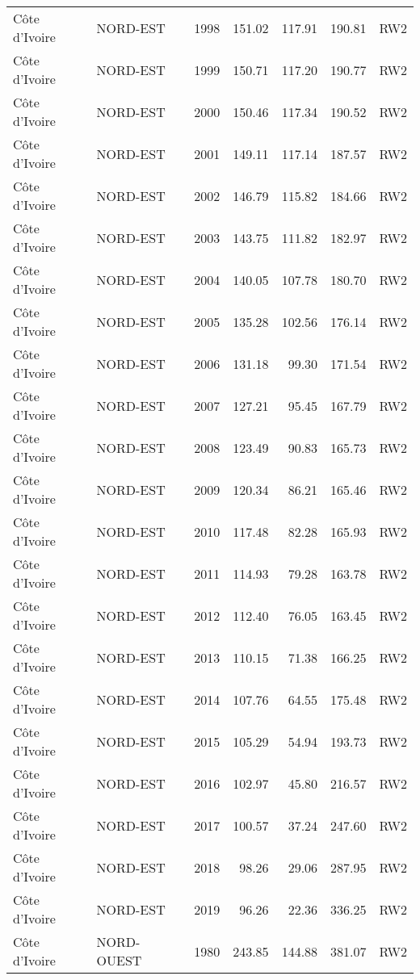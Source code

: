 \begin{longtable}{lllrrrl}
  C\^{o}te d'Ivoire & NORD-EST & 1998 & 151.02 & 117.91 & 190.81 & RW2 \\ 
  C\^{o}te d'Ivoire & NORD-EST & 1999 & 150.71 & 117.20 & 190.77 & RW2 \\ 
  C\^{o}te d'Ivoire & NORD-EST & 2000 & 150.46 & 117.34 & 190.52 & RW2 \\ 
  C\^{o}te d'Ivoire & NORD-EST & 2001 & 149.11 & 117.14 & 187.57 & RW2 \\ 
  C\^{o}te d'Ivoire & NORD-EST & 2002 & 146.79 & 115.82 & 184.66 & RW2 \\ 
  C\^{o}te d'Ivoire & NORD-EST & 2003 & 143.75 & 111.82 & 182.97 & RW2 \\ 
  C\^{o}te d'Ivoire & NORD-EST & 2004 & 140.05 & 107.78 & 180.70 & RW2 \\ 
  C\^{o}te d'Ivoire & NORD-EST & 2005 & 135.28 & 102.56 & 176.14 & RW2 \\ 
  C\^{o}te d'Ivoire & NORD-EST & 2006 & 131.18 & 99.30 & 171.54 & RW2 \\ 
  C\^{o}te d'Ivoire & NORD-EST & 2007 & 127.21 & 95.45 & 167.79 & RW2 \\ 
  C\^{o}te d'Ivoire & NORD-EST & 2008 & 123.49 & 90.83 & 165.73 & RW2 \\ 
  C\^{o}te d'Ivoire & NORD-EST & 2009 & 120.34 & 86.21 & 165.46 & RW2 \\ 
  C\^{o}te d'Ivoire & NORD-EST & 2010 & 117.48 & 82.28 & 165.93 & RW2 \\ 
  C\^{o}te d'Ivoire & NORD-EST & 2011 & 114.93 & 79.28 & 163.78 & RW2 \\ 
  C\^{o}te d'Ivoire & NORD-EST & 2012 & 112.40 & 76.05 & 163.45 & RW2 \\ 
  C\^{o}te d'Ivoire & NORD-EST & 2013 & 110.15 & 71.38 & 166.25 & RW2 \\ 
  C\^{o}te d'Ivoire & NORD-EST & 2014 & 107.76 & 64.55 & 175.48 & RW2 \\ 
  C\^{o}te d'Ivoire & NORD-EST & 2015 & 105.29 & 54.94 & 193.73 & RW2 \\ 
  C\^{o}te d'Ivoire & NORD-EST & 2016 & 102.97 & 45.80 & 216.57 & RW2 \\ 
  C\^{o}te d'Ivoire & NORD-EST & 2017 & 100.57 & 37.24 & 247.60 & RW2 \\ 
  C\^{o}te d'Ivoire & NORD-EST & 2018 & 98.26 & 29.06 & 287.95 & RW2 \\ 
  C\^{o}te d'Ivoire & NORD-EST & 2019 & 96.26 & 22.36 & 336.25 & RW2 \\ 
  C\^{o}te d'Ivoire & NORD-OUEST & 1980 & 243.85 & 144.88 & 381.07 & RW2 \\ 

\end{longtable}
